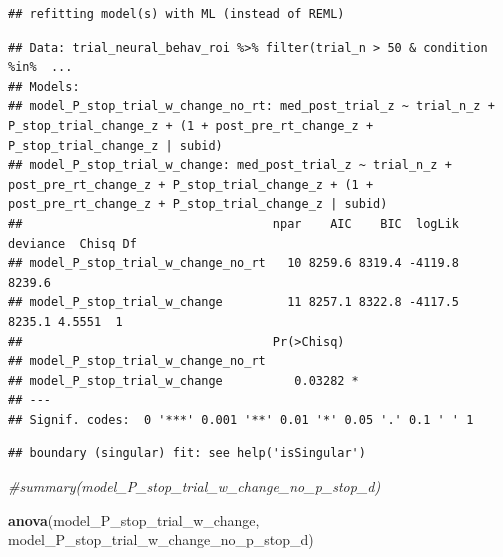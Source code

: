 \documentclass[
]{article}
\newenvironment{Shaded}{\begin{snugshade}}{\end{snugshade}}
\newcommand{\CommentTok}[1]{\textcolor[rgb]{0.56,0.35,0.01}{\textit{#1}}}
\newcommand{\DecValTok}[1]{\textcolor[rgb]{0.00,0.00,0.81}{#1}}
\newcommand{\KeywordTok}[1]{\textcolor[rgb]{0.13,0.29,0.53}{\textbf{#1}}}
\newcommand{\NormalTok}[1]{#1}
\newcommand{\OperatorTok}[1]{\textcolor[rgb]{0.81,0.36,0.00}{\textbf{#1}}}
\newcommand{\StringTok}[1]{\textcolor[rgb]{0.31,0.60,0.02}{#1}}
\begin{document}
\begin{verbatim}
## refitting model(s) with ML (instead of REML)
\end{verbatim}

\begin{verbatim}
## Data: trial_neural_behav_roi %>% filter(trial_n > 50 & condition %in%  ...
## Models:
## model_P_stop_trial_w_change_no_rt: med_post_trial_z ~ trial_n_z + P_stop_trial_change_z + (1 + post_pre_rt_change_z + P_stop_trial_change_z | subid)
## model_P_stop_trial_w_change: med_post_trial_z ~ trial_n_z + post_pre_rt_change_z + P_stop_trial_change_z + (1 + post_pre_rt_change_z + P_stop_trial_change_z | subid)
##                                   npar    AIC    BIC  logLik deviance  Chisq Df
## model_P_stop_trial_w_change_no_rt   10 8259.6 8319.4 -4119.8   8239.6          
## model_P_stop_trial_w_change         11 8257.1 8322.8 -4117.5   8235.1 4.5551  1
##                                   Pr(>Chisq)  
## model_P_stop_trial_w_change_no_rt             
## model_P_stop_trial_w_change          0.03282 *
## ---
## Signif. codes:  0 '***' 0.001 '**' 0.01 '*' 0.05 '.' 0.1 ' ' 1
\end{verbatim}

\begin{Shaded}
\end{Shaded}

\begin{verbatim}
## boundary (singular) fit: see help('isSingular')
\end{verbatim}

\begin{Shaded}
\begin{Highlighting}[]
\CommentTok{#summary(model_P_stop_trial_w_change_no_p_stop_d)}


\KeywordTok{anova}\NormalTok{(model_P_stop_trial_w_change, model_P_stop_trial_w_change_no_p_stop_d)}
\end{Highlighting}
\end{Shaded}
\end{document}
